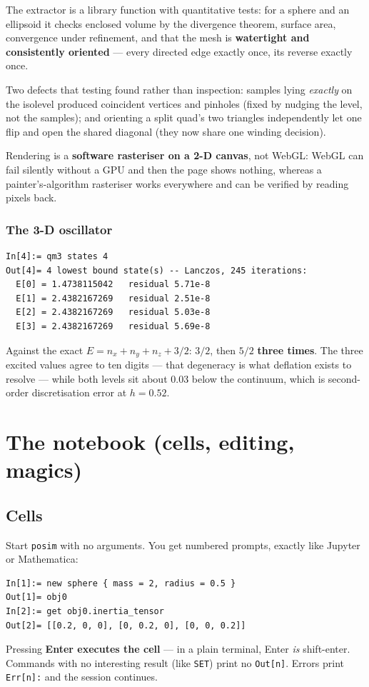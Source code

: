 \documentclass[11pt]{article}
\newcommand{\kw}[1]{\texttt{\uppercase{#1}}}
\newcommand{\code}[1]{\texttt{#1}}
\begin{document}
The extractor is a library function with quantitative tests: for a sphere
and an ellipsoid it checks enclosed volume by the divergence theorem,
surface area, convergence under refinement, and that the mesh is
\textbf{watertight and consistently oriented} --- every directed edge
exactly once, its reverse exactly once.

Two defects that testing found rather than inspection: samples lying
\emph{exactly} on the isolevel produced coincident vertices and pinholes
(fixed by nudging the level, not the samples); and orienting a split
quad's two triangles independently let one flip and open the shared
diagonal (they now share one winding decision).

Rendering is a \textbf{software rasteriser on a 2-D canvas}, not WebGL:
WebGL can fail silently without a GPU and then the page shows nothing,
whereas a painter's-algorithm rasteriser works everywhere and can be
verified by reading pixels back.

\subsubsection*{The 3-D oscillator}

\begin{lstlisting}
In[4]:= qm3 states 4
Out[4]= 4 lowest bound state(s) -- Lanczos, 245 iterations:
  E[0] = 1.4738115042   residual 5.71e-8
  E[1] = 2.4382167269   residual 2.51e-8
  E[2] = 2.4382167269   residual 5.03e-8
  E[3] = 2.4382167269   residual 5.69e-8
\end{lstlisting}

Against the exact $E=n_x+n_y+n_z+3/2$: $3/2$, then $5/2$ \textbf{three
times}. The three excited values agree to ten digits --- that degeneracy
is what deflation exists to resolve --- while both levels sit about 0.03
below the continuum, which is second-order discretisation error at
$h=0.52$.

\section{The notebook (cells, editing, magics)}

\subsection{Cells}
Start \code{posim} with no arguments. You get numbered prompts, exactly
like Jupyter or Mathematica:
\begin{lstlisting}
In[1]:= new sphere { mass = 2, radius = 0.5 }
Out[1]= obj0
In[2]:= get obj0.inertia_tensor
Out[2]= [[0.2, 0, 0], [0, 0.2, 0], [0, 0, 0.2]]
\end{lstlisting}
Pressing \textbf{Enter executes the cell} --- in a plain terminal, Enter
\emph{is} shift-enter. Commands with no interesting result (like
\kw{set}) print no \code{Out[n]}. Errors print \code{Err[n]:} and the
session continues.
\end{document}
